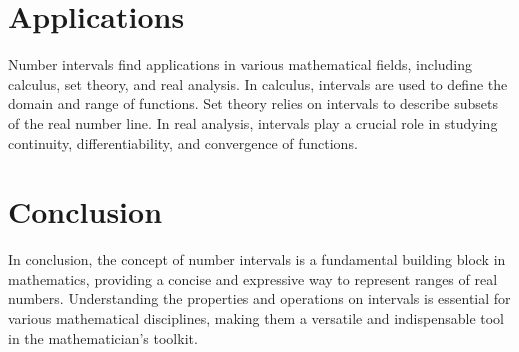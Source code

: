 \documentclass{article}
\begin{document}
\section{Applications}
Number intervals find applications in various mathematical fields, including calculus, set theory, and real analysis. In calculus, intervals are used to define the domain and range of functions. Set theory relies on intervals to describe subsets of the real number line. In real analysis, intervals play a crucial role in studying continuity, differentiability, and convergence of functions.

\section{Conclusion}
In conclusion, the concept of number intervals is a fundamental building block in mathematics, providing a concise and expressive way to represent ranges of real numbers. Understanding the properties and operations on intervals is essential for various mathematical disciplines, making them a versatile and indispensable tool in the mathematician's toolkit.
\end{document}
